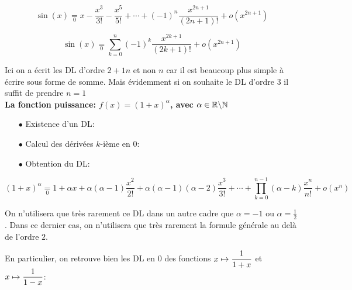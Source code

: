 \documentclass[a4paper, 11pt]{article}
\begin{document}
{\begin{itemize}
 \end{itemize}
 
 
\begin{center}
\begin{dboxminipage}{0.5\textwidth}
$$\sin(x) \underset{0}{=} x -\frac{x^3}{3!}-\frac{x^5}{5!}+\cdots +(-1)^n \frac{x^{2n+1}}{(2n+1)!} +o(x^{2n+1})
$$
\end{dboxminipage}
\end{center}

\begin{center}
\begin{dboxminipage}{0.5\textwidth}
$$\sin(x) \underset{0}{=} \sum_{k=0}^n(-1)^k \frac{x^{2k+1}}{(2k+1)!}+o(x^{2n+1})
$$
\end{dboxminipage}
\end{center} 
Ici on a écrit les DL d'ordre $2+1n$ et non $n$ car il est beaucoup plus simple à écrire sous forme de somme. Mais évidemment si on souhaite le DL d'ordre $3$ il suffit de prendre $n=1$ \\

 \textbf{\large{La fonction puissance: $f(x) = (1+x)^\alpha$, avec $\alpha \in \mathbb{R}\backslash\mathbb{N}$}}\vsec
 \begin{itemize}
 \item[$\bullet$] Existence d'un DL:\dotfill
 \item[$\bullet$] Calcul des d\'eriv\'ees $k$-i\`{e}me en 0: \dotfill 
 \item[$\bullet$] Obtention du DL:\vsec\\

 \end{itemize}

\begin{center}
\begin{dboxminipage}{0.5\textwidth}
$$(1+x)^\alpha \underset{0}{=} 1+\alpha x +\alpha(\alpha-1) \frac{x^2}{2!} +\alpha (\alpha -1)(\alpha -2)\frac{x^3}{3!} +\cdots + \prod_{k=0}^{n-1} (\alpha-k) \frac{x^n}{n!}+o(x^n)
$$
\end{dboxminipage}
\end{center}
On n'utilisera que très rarement ce DL dans un autre cadre que $\alpha =-1$ ou $\alpha =\frac{1}{2}$. Dans ce dernier cas, on n'utilisera que très rarement la formule générale au delà de l'ordre $2$. 


% 
\noindent En particulier, on retrouve bien les DL en 0 des fonctions $x\mapsto \displaystyle\frac{1}{1+x}$ et $x\mapsto \displaystyle\frac{1}{1-x}$:%



}
\end{document}
